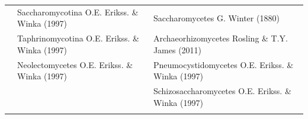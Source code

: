 \documentclass[]{book}
\begin{document}
\begin{longtable}[]{@{}lll@{}}
\begin{minipage}[t]{0.32\columnwidth}
\strut
\end{minipage} & \begin{minipage}[t]{0.28\columnwidth}\raggedright\strut
Saccharomycotina O.E. Erikss. \& Winka (1997)\strut
\end{minipage} & \begin{minipage}[t]{0.31\columnwidth}\raggedright\strut
Saccharomycetes G. Winter (1880)\strut
\end{minipage}\tabularnewline
\begin{minipage}[t]{0.32\columnwidth}\raggedright\strut
\strut
\end{minipage} & \begin{minipage}[t]{0.28\columnwidth}\raggedright\strut
Taphrinomycotina O.E. Erikss. \& Winka (1997)\strut
\end{minipage} & \begin{minipage}[t]{0.31\columnwidth}\raggedright\strut
Archaeorhizomycetes Rosling \& T.Y. James (2011)\strut
\end{minipage}\tabularnewline
\begin{minipage}[t]{0.32\columnwidth}\raggedright\strut
\strut
\end{minipage} & \begin{minipage}[t]{0.28\columnwidth}\raggedright\strut
Neolectomycetes O.E. Erikss. \& Winka (1997)\strut
\end{minipage} & \begin{minipage}[t]{0.31\columnwidth}\raggedright\strut
Pneumocystidomycetes O.E. Erikss. \& Winka (1997)\strut
\end{minipage}\tabularnewline
\begin{minipage}[t]{0.32\columnwidth}\raggedright\strut
\strut
\end{minipage} & \begin{minipage}[t]{0.28\columnwidth}\raggedright\strut
\strut
\end{minipage} & \begin{minipage}[t]{0.31\columnwidth}\raggedright\strut
Schizosaccharomycetes O.E. Erikss. \& Winka (1997)\strut
\end{minipage}\tabularnewline
\begin{minipage}[t]{0.32\columnwidth}\raggedright\strut
\strut
\end{minipage} & \begin{minipage}[t]{0.28\columnwidth}\raggedright\strut
\strut
\end{minipage} & \begin{minipage}[t]{0.31\columnwidth}\raggedright\strut

\end{minipage}
\end{longtable}
\end{document}
